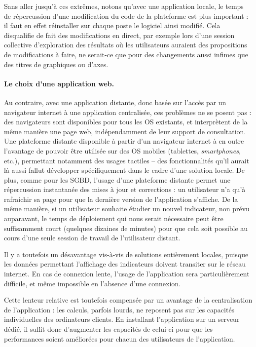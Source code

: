 Sans aller jusqu'à ces extrêmes, notons qu'avec une application locale, le temps de répercussion d'une modification du code de la plateforme est plus important : il faut en effet réinstaller sur chaque poste le logiciel ainsi modifié.
Cela disqualifie de fait des modifications \og en direct\fg{}, par exemple lors d'une session collective d'exploration des résultats où les utilisateurs auraient des propositions de modifications à faire, ne serait-ce que pour des changements aussi infimes que des titres de graphiques ou d'axes.

\paragraph{Le choix d'une application web.}

Au contraire, avec une application distante, donc basée sur l'accès par un navigateur internet à une application centralisée, ces problèmes ne se posent pas : des navigateurs sont disponibles pour tous les OS existants, et interprètent de la même manière une page web, indépendamment de leur support de consultation.
Une plateforme distante disponible à partir d'un navigateur internet à en outre l'avantage de pouvoir être utilisée sur des OS mobiles (tablettes, \textit{smartphones}, etc.), permettant notamment des usages tactiles -- des fonctionnalités qu'il aurait là aussi fallut développer spécifiquement dans le cadre d'une solution locale.
De plus, comme pour les SGBD, l'usage d'une plateforme distante permet une répercussion instantanée des mises à jour et corrections : un utilisateur n'a qu'à rafraichir sa page pour que la dernière version de l'application s'affiche.
De la même manière, si un utilisateur souhaite étudier un nouvel indicateur, non prévu auparavant, le temps de déploiement qui nous serait nécessaire peut être suffisamment court (quelques dizaines de minutes) pour que cela soit possible au cours d'une seule session de travail de l'utilisateur distant.

Il y a toutefois un désavantage vis-à-vis de solutions entièrement locales, puisque les données permettant l'affichage des indicateurs doivent transiter sur le réseau internet.
En cas de connexion lente, l'usage de l'application sera particulièrement difficile, et même impossible en l'absence d'une connexion.

Cette lenteur relative est toutefois compensée par un avantage de la centralisation de l'application : les calculs, parfois lourds, ne reposent pas sur les capacités individuelles des ordinateurs clients.
En installant l'application sur un serveur dédié, il suffit donc d'augmenter les capacités de celui-ci pour que les performances soient améliorées pour chacun des utilisateurs de l'application.

